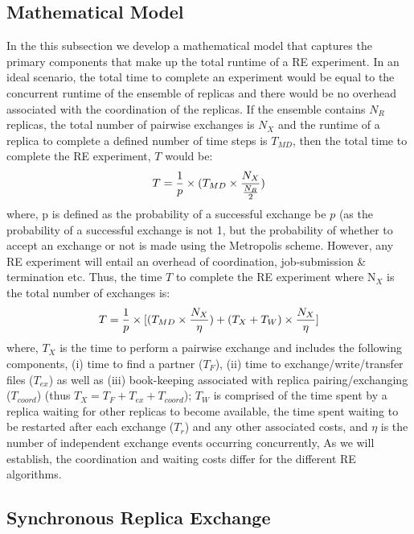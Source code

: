 \documentclass{rspublic}
\newcommand{\alnote}[1]{ {\textcolor{blue} { ***andre: #1 }}}
\newcommand{\alnote}[1]{}
\begin{document}
\subsection{Mathematical Model}

In the this subsection we develop a mathematical model that captures
the primary components that make up the total runtime of a RE
experiment. In an ideal scenario, the total time to complete an
experiment would be equal to the concurrent runtime of the ensemble of
replicas and there would be no overhead associated with the
coordination of the replicas.  If the ensemble contains $N_R$
replicas, the total number of pairwise exchanges is $N_X$ and the
runtime of a replica to complete a defined number of time steps is
$T_{MD}$, then the total time to complete the RE experiment, $T$ would
be:
\begin{eqnarray}
T = {1\over p} \times (T_{MD} \times  {N_X \over {N_R \over 2}}) 
\label{eq:totaltime}
\end{eqnarray}
where, p is defined as the probability of a successful exchange be $p$
(as the probability of a successful exchange is not 1, but the
probability of whether to accept an exchange or not is made using the
Metropolis scheme.  However, any RE experiment will entail an overhead
of coordination, job-submission \& termination etc. Thus, the time $T$
to complete the RE experiment where N$_X$ is the total number of
exchanges is:
\begin{eqnarray}
  T = {1\over p} \times [(T_{MD} \times  {N_X \over {\eta}}) +
  {(T_{X} + T_{W})} \times {N_X \over \eta}]
\label{eq:totaltime}
\end{eqnarray}
where, $T_{X}$ is the time to perform a pairwise exchange and includes
the following components, (i) time to find a partner ($T_F$), (ii)
time to exchange/write/transfer files ($T_{ex}$) as well as (iii)
book-keeping associated with replica pairing/exchanging ($T_{coord}$)
(thus $T_{X} = T_{F} + T_{ex}+T_{coord}$); 
$T_W$ is comprised of the time spent by a replica waiting for other
replicas to become available, the time spent waiting to be restarted
after each exchange ($T_r$) and any other associated costs, and $\eta$
is the number of independent exchange events occurring concurrently,
As we will establish, the coordination and waiting costs differ for
the different RE algorithms.

\subsection{Synchronous Replica Exchange}
\end{document}
